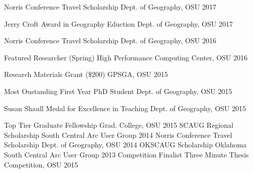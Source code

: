 
\begin{cvhonors}

  \cvhonor
    {Norris Conference Travel Scholarship} %
    {} %
    {Dept. of Geography, OSU} %
    {2017} %

  \cvhonor
    {Jerry Croft Award in Geography Eduction} %
    {} %
    {Dept. of Geography, OSU} %
    {2017} %

  \cvhonor
    {Norris Conference Travel Scholarship} %
    {} %
    {Dept. of Geography, OSU} %
    {2016} %

  \cvhonor
    {Featured Researcher (Spring)}%
    {} %
    {High Performance Computing Center, OSU} %
    {2016} %

  \cvhonor
    {Research Materials Grant (\$200)}%
    {} %
    {GPSGA, OSU} %
    {2015} %

  \cvhonor
    {Most Oustanding First Year PhD Student}%
    {} %
    {Dept. of Geography, OSU} %
    {2015} %

  \cvhonor
    {Susan Shaull Medal for Excellence in Teaching}%
    {} %
    {Dept. of Geography, OSU} %
    {2015} %

  \cvhonor
    {Top Tier Graduate Fellowship}%
    {} %
    {Grad. College, OSU} %
    {2015} %
  \cvhonor
    {SCAUG Regional Scholarship}%
    {} %
    {South Central Arc User Group} %
    {2014} %
  \cvhonor
    {Norris Conference Travel Scholarship}%
    {} %
    {Dept. of Geography, OSU} %
    {2014} %
  \cvhonor
    {OKSCAUG Scholarship}%
    {} %
    {Oklahoma South Central Arc User Group} %
    {2013} %
  \cvhonor
    {Competition Finalist}%
    {} %
    {Three Minute Thesis Competition, OSU} %
    {2015} %
\end{cvhonors}
